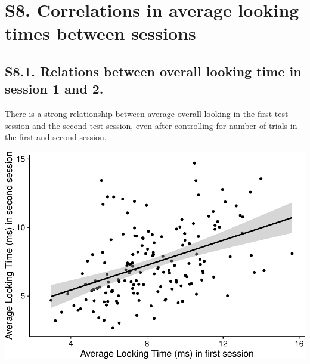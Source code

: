 \documentclass[
  man, donotrepeattitle,floatsintext]{apa6}
\begin{document}
\hypertarget{s8.-correlations-in-average-looking-times-between-sessions}{%
\section{S8. Correlations in average looking times between sessions}\label{s8.-correlations-in-average-looking-times-between-sessions}}

\hypertarget{s8.1.-relations-between-overall-looking-time-in-session-1-and-2.}{%
\subsection{S8.1. Relations between overall looking time in session 1 and 2.}\label{s8.1.-relations-between-overall-looking-time-in-session-1-and-2.}}

There is a strong relationship between average overall looking in the first test session and the second test session, even after controlling for number of trials in the first and second session.

\includegraphics{MB1T_supplement_files/figure-latex/unnamed-chunk-16-1.pdf}
\end{document}
